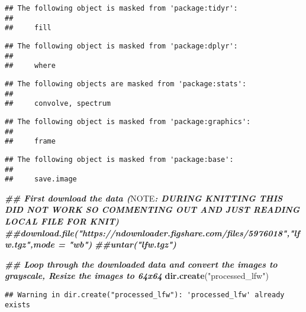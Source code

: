 \documentclass[
]{article}
\newenvironment{Shaded}{\begin{snugshade}}{\end{snugshade}}
\newcommand{\AlertTok}[1]{\textcolor[rgb]{0.94,0.16,0.16}{#1}}
\newcommand{\DocumentationTok}[1]{\textcolor[rgb]{0.56,0.35,0.01}{\textbf{\textit{#1}}}}
\newcommand{\FunctionTok}[1]{\textcolor[rgb]{0.13,0.29,0.53}{\textbf{#1}}}
\newcommand{\NormalTok}[1]{#1}
\newcommand{\StringTok}[1]{\textcolor[rgb]{0.31,0.60,0.02}{#1}}
\begin{document}
\begin{verbatim}
## The following object is masked from 'package:tidyr':
## 
##     fill
\end{verbatim}

\begin{verbatim}
## The following object is masked from 'package:dplyr':
## 
##     where
\end{verbatim}

\begin{verbatim}
## The following objects are masked from 'package:stats':
## 
##     convolve, spectrum
\end{verbatim}

\begin{verbatim}
## The following object is masked from 'package:graphics':
## 
##     frame
\end{verbatim}

\begin{verbatim}
## The following object is masked from 'package:base':
## 
##     save.image
\end{verbatim}

\begin{Shaded}
\begin{Highlighting}[]
\DocumentationTok{\#\# First download the data (}\AlertTok{NOTE}\DocumentationTok{: DURING KNITTING THIS DID NOT WORK SO COMMENTING OUT AND JUST READING LOCAL FILE FOR KNIT)}
\DocumentationTok{\#\#download.file("https://ndownloader.figshare.com/files/5976018","lfw.tgz",mode = "wb")}
\DocumentationTok{\#\#untar("lfw.tgz")}

\DocumentationTok{\#\# Loop through the downloaded data and convert the images to grayscale, Resize the images to 64x64}
\FunctionTok{dir.create}\NormalTok{(}\StringTok{"processed\_lfw"}\NormalTok{) }
\end{Highlighting}
\end{Shaded}

\begin{verbatim}
## Warning in dir.create("processed_lfw"): 'processed_lfw' already exists
\end{verbatim}
\end{document}
